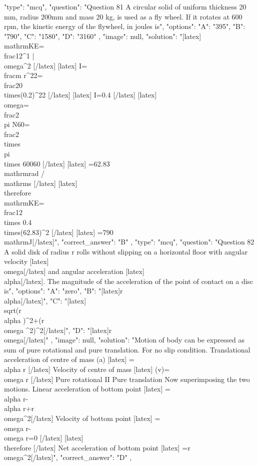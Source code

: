   {
    "type": "mcq",
    "question": "Question 81 A circular solid of uniform thickness 20 mm, radius 200mm and mass 20 kg, is used as a fly wheel. If it rotates at 600 rpm, the kinetic energy of the flywheel, in joules is",
    "options": {
      "A": "395",
      "B": "790",
      "C": "1580",
      "D": "3160"
    },
    "image": null,
    "solution": "[latex]\\mathrm{KE}=\\frac{1}{2}^{1} |\\omega^{2} [/latex] [latex] I=\\frac{m r^{2}}{2}=\\frac{20 \\times(0.2)^{2}}{2} [/latex] [latex] I=0.4 [/latex] [latex] \\omega=\\frac{2 \\pi N}{60}=\\frac{2 \\times \\pi \\times 600}{60} [/latex] [latex] =62.83 \\mathrm{rad} / \\mathrm{s} [/latex] [latex] \\therefore \\mathrm{KE}=\\frac{1}{2} \\times 0.4 \\times(62.83)^{2} [/latex] [latex] =790 \\mathrm{J}[/latex]",
    "correct_answer": "B"
  },
  {
    "type": "mcq",
    "question": "Question 82 A solid disk of radius r rolls without slipping on a horizontal floor with angular velocity [latex]\\omega[/latex] and angular acceleration [latex]\\alpha[/latex]. The magnitude of the acceleration of the point of contact on a disc is",
    "options": {
      "A": "zero",
      "B": "[latex]r\\alpha[/latex]",
      "C": "[latex]\\sqrt{(r\\alpha )^{2}+(r\\omega ^{2})^{2}}[/latex]",
      "D": "[latex]r\\omega[/latex]"
    },
    "image": null,
    "solution": "Motion of body can be expressed as sum of pure rotational and pure translation. For no slip condition. Translational acceleration of centre of mass (a) [latex] =\\alpha r [/latex] Velocity of centre of mass [latex] (v)=\\omega r [/latex] Pure rotational II Pure translation Now superimposing the two motions. Linear acceleration of bottom point [latex] =\\alpha r-\\alpha r+r \\omega^{2}[/latex] Velocity of bottom point [latex] =\\omega r-\\omega r=0 [/latex] [latex] \\therefore [/latex] Net acceleration of bottom point [latex] =r \\omega^{2}[/latex]",
    "correct_answer": "D"
  },
